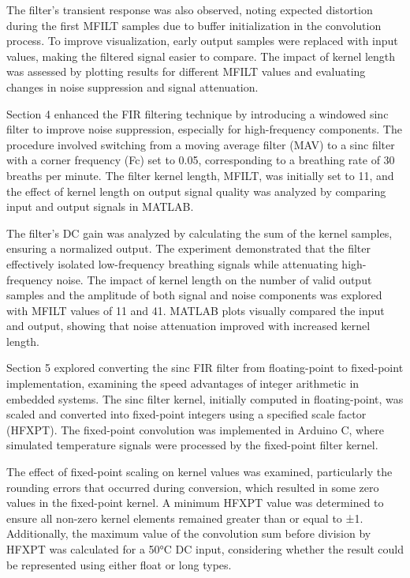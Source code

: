 \documentclass[journal]{IEEEtran}
\begin{document}
The filter’s transient response was also observed, noting expected distortion during the first MFILT samples due to buffer initialization in the convolution process. To improve visualization, early output samples were replaced with input values, making the filtered signal easier to compare. The impact of kernel length was assessed by plotting results for different MFILT values and evaluating changes in noise suppression and signal attenuation.

Section 4 enhanced the FIR filtering technique by introducing a windowed sinc filter to improve noise suppression, especially for high-frequency components. The procedure involved switching from a moving average filter (MAV) to a sinc filter with a corner frequency (Fc) set to 0.05, corresponding to a breathing rate of 30 breaths per minute. The filter kernel length, MFILT, was initially set to 11, and the effect of kernel length on output signal quality was analyzed by comparing input and output signals in MATLAB.

The filter’s DC gain was analyzed by calculating the sum of the kernel samples, ensuring a normalized output. The experiment demonstrated that the filter effectively isolated low-frequency breathing signals while attenuating high-frequency noise. The impact of kernel length on the number of valid output samples and the amplitude of both signal and noise components was explored with MFILT values of 11 and 41. MATLAB plots visually compared the input and output, showing that noise attenuation improved with increased kernel length.

Section 5 explored converting the sinc FIR filter from floating-point to fixed-point implementation, examining the speed advantages of integer arithmetic in embedded systems. The sinc filter kernel, initially computed in floating-point, was scaled and converted into fixed-point integers using a specified scale factor (HFXPT). The fixed-point convolution was implemented in Arduino C, where simulated temperature signals were processed by the fixed-point filter kernel.

The effect of fixed-point scaling on kernel values was examined, particularly the rounding errors that occurred during conversion, which resulted in some zero values in the fixed-point kernel. A minimum HFXPT value was determined to ensure all non-zero kernel elements remained greater than or equal to ±1. Additionally, the maximum value of the convolution sum before division by HFXPT was calculated for a 50°C DC input, considering whether the result could be represented using either float or long types.
\end{document}

